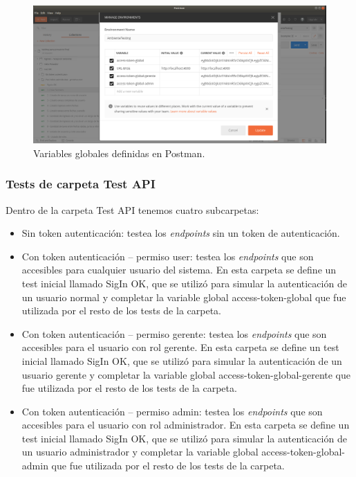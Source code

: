 \begin{figure}[ht]
	\centering
	\includegraphics[width=1\textwidth]{./Figures/PostmanEnvironmnet.png}
	\caption{Variables globales definidas en Postman.}
	\label{fig:PostmanEnvironmnet}
\end{figure}

\subsubsection{Tests de carpeta Test API }

Dentro de la carpeta Test API tenemos cuatro subcarpetas:

\begin{itemize}
\item Sin token autenticación: testea los \textit{endpoints} sin un token de autenticación.
\item Con token autenticación – permiso user: testea los \textit{endpoints}  que son accesibles para cualquier usuario del sistema. En esta carpeta se define un test inicial llamado SigIn OK, que se utilizó para simular la autenticación de un usuario normal y completar la variable global access-token-global que fue utilizada por el resto de los tests de la carpeta.
\item Con token autenticación – permiso gerente: testea los \textit{endpoints}  que son accesibles para el usuario con rol gerente. En esta carpeta se define un test inicial llamado SigIn OK, que se utilizó para simular la autenticación de un usuario gerente y completar la variable global access-token-global-gerente que fue utilizada por el resto de los tests de la carpeta.
\item Con token autenticación – permiso admin: testea los \textit{endpoints} que son accesibles para el usuario con rol administrador. En esta carpeta se define un test inicial llamado SigIn OK, que se utilizó para simular la autenticación de un usuario administrador y completar la variable global access-token-global-admin que fue utilizada por el resto de los tests de la carpeta.
\end{itemize}

